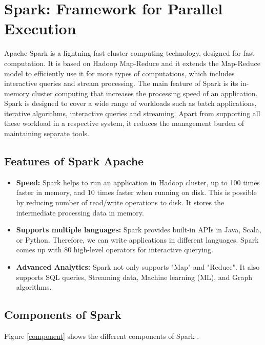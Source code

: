 \section{Spark: Framework for Parallel Execution}
Apache Spark is a lightning-fast cluster computing technology, designed for fast computation. It is based on Hadoop Map-Reduce and it extends the Map-Reduce model to efficiently use it for more types of computations, which includes interactive queries and stream processing. The main feature of Spark is its in-memory cluster computing that increases the processing speed of an application.\\

Spark is designed to cover a wide range of workloads such as batch applications, iterative algorithms, interactive queries and streaming. Apart from supporting all these workload in a respective system, it reduces the management burden of maintaining separate tools.\\

\subsection{Features of Spark Apache}
\begin{itemize}
\item \textbf{Speed:} Spark helps to run an application in Hadoop cluster, up to 100 times faster in memory, and 10 times faster when running on disk. This is possible by reducing number of read/write operations to disk. It stores the intermediate processing data in memory.
\item \textbf{Supports multiple languages:} Spark provides built-in APIs in Java, Scala, or Python. Therefore, we can write applications in different languages. Spark comes up with 80 high-level operators for interactive querying.
\item \textbf{Advanced Analytics:} Spark not only supports "Map" and "Reduce". It also supports SQL queries, Streaming data, Machine learning (ML), and Graph algorithms.\\
\end{itemize}

\subsection{Components of Spark}

Figure \ref{component} shows the different components of Spark \cite{cite1}.


